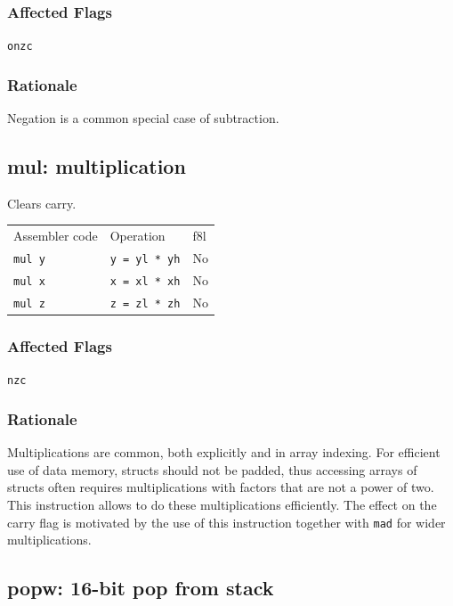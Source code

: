 \documentclass{book}
\begin{document}
\subsubsection*{Affected Flags}

\texttt{onzc}

\subsubsection*{Rationale}

Negation is a common special case of subtraction.


\subsection{mul: multiplication}

Clears carry.

\begin{tabular}{l l l}
Assembler code & Operation            & f8l \\
\texttt{mul y} & \texttt{y = yl * yh} & No \\
\texttt{mul x} & \texttt{x = xl * xh} & No \\
\texttt{mul z} & \texttt{z = zl * zh} & No \\
\end{tabular}

\subsubsection*{Affected Flags}

\texttt{nzc}

\subsubsection*{Rationale}

Multiplications are common, both explicitly and in array indexing. For efficient use of data memory, structs should not be padded, thus accessing arrays of structs often requires multiplications with factors that are not a power of two. This instruction allows to do these multiplications efficiently. The effect on the carry flag is motivated by the use of this instruction together with \texttt{mad} for wider multiplications.


\subsection{popw: 16-bit pop from stack}
\end{document}
